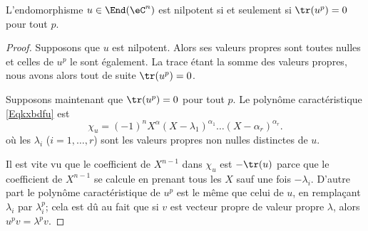 \begin{lemma}   \label{LemzgNOjY}
    L'endomorphisme \( u\in\End(\eC^n)\) est nilpotent si et seulement si \( \tr(u^p)=0\) pour tout \( p\).
\end{lemma}

\begin{proof}
    Supposons que \( u\) est nilpotent. Alors ses valeurs propres sont toutes nulles et celles de \( u^p\) le sont également. La trace étant la somme des valeurs propres, nous avons alors tout de suite \( \tr(u^p)=0\).

    Supposons maintenant que \( \tr(u^p)=0\) pour tout \( p\). Le polynôme caractéristique \eqref{Eqkxbdfu} est
    \begin{equation}    \label{EqfnCqWq}
        \chi_u=(-1)^nX^{\alpha}(X-\lambda_1)^{\alpha_1}\ldots (X-\alpha_r)^{\alpha_r}.
    \end{equation}
    où les \( \lambda_i\) (\( i=1,\ldots, r\)) sont les valeurs propres non nulles distinctes de \( u\).

    Il est vite vu que le coefficient de \( X^{n-1}\) dans \( \chi_u\) est \( -\tr(u)\) parce que le coefficient de \( X^{n-1}\) se calcule en prenant tous les $X$ sauf une fois \( -\lambda_i\). D'autre part le polynôme caractéristique de \( u^p \) est le même que celui de \( u\), en remplaçant \( \lambda_i\) par \( \lambda_i^p\); cela est dû au fait que si \( v\) est vecteur propre de valeur propre \( \lambda\), alors \( u^pv=\lambda^pv\).


\end{proof}
